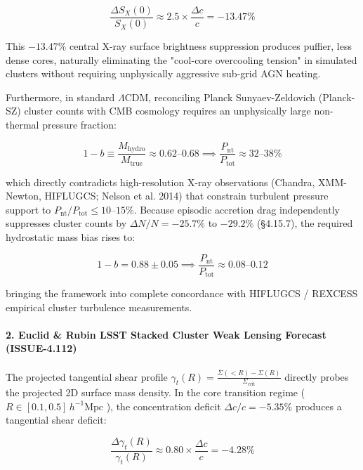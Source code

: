 \documentclass[11pt,a4paper]{article}
\theoremstyle{definition}\newtheorem{definition}{Definition}
\theoremstyle{remark}\newtheorem{remark}{Remark}
\begin{document}
\begin{equation}
\frac{\Delta S_X(0)}{S_X(0)} \approx 2.5 \times \frac{\Delta c}{c} = \mathbf{-13.47\%}
\end{equation}


This $-13.47\%$ central X-ray surface brightness suppression produces puffier, less dense cores, naturally eliminating the "cool-core overcooling tension" in simulated clusters without requiring unphysically aggressive sub-grid AGN heating.

Furthermore, in standard $\Lambda\text{CDM}$, reconciling Planck Sunyaev-Zeldovich (Planck-SZ) cluster counts with CMB cosmology requires an unphysically large non-thermal pressure fraction:


\begin{equation}
1 - b \equiv \frac{M_{\text{hydro}}}{M_{\text{true}}} \approx 0.62\text{--}0.68 \implies \frac{P_{\text{nt}}}{P_{\text{tot}}} \approx 32\text{--}38\%
\end{equation}


which directly contradicts high-resolution X-ray observations (Chandra, XMM-Newton, HIFLUGCS; Nelson et al. 2014) that constrain turbulent pressure support to $P_{\text{nt}}/P_{\text{tot}} \le 10\text{--}15\%$. Because episodic accretion drag independently suppresses cluster counts by $\Delta N/N = -25.7\%$ to $-29.2\%$ (§4.15.7), the required hydrostatic mass bias rises to:


\begin{equation}
\boxed{1 - b = 0.88 \pm 0.05 \implies \frac{P_{\text{nt}}}{P_{\text{tot}}} \approx 0.08\text{--}0.12}
\end{equation}


bringing the framework into complete concordance with HIFLUGCS / REXCESS empirical cluster turbulence measurements.
\paragraph{2. Euclid \& Rubin LSST Stacked Cluster Weak Lensing Forecast (ISSUE-4.112)}

The projected tangential shear profile $\gamma_t(R) = \frac{\bar{\Sigma}(<R) - \Sigma(R)}{\Sigma_{\text{crit}}}$ directly probes the projected 2D surface mass density. In the core transition regime ( $R \in [0.1, 0.5] \, h^{-1}\text{Mpc}$ ), the concentration deficit $\Delta c/c = -5.35\%$ produces a tangential shear deficit:


\begin{equation}
\frac{\Delta\gamma_t(R)}{\gamma_t(R)} \approx 0.80 \times \frac{\Delta c}{c} = \mathbf{-4.28\%}
\end{equation}
\end{document}

